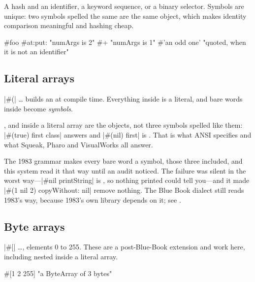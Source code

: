 A hash and an identifier, a keyword sequence, or a binary selector. Symbols
are unique: two symbols spelled the same are the same object, which makes
identity comparison meaningful and hashing cheap.

\begin{st}
#foo
#at:put:            "numArgs is 2"
#+                  "numArgs is 1"
#'an odd one'       "quoted, when it is not an identifier"
\end{st}

\subsection{Literal arrays}

\ct|#(| \ldots \ct{)} builds an  at compile time. Everything inside
is a literal, and bare words inside become \emph{symbols}.


\begin{stnote}
,  and  inside a literal array are the objects,
not three symbols spelled like them: \ct|#(true) first class| answers
 and \ct|#(nil) first| is . That is what ANSI specifies and
what Squeak, Pharo and VisualWorks all answer.

The 1983 grammar makes every bare word a symbol, those three included, and
this system read it that way until an audit noticed. The failure was silent
in the worst way---\ct|#nil printString| is , so nothing printed
could tell you---and it made \ct|#(1 nil 2) copyWithout: nil| remove nothing.
The Blue Book dialect still reads 1983's way, because 1983's own library
depends on it; see .
\end{stnote}

\subsection{Byte arrays}

\ct|#[| \ldots \ct{]}, elements 0 to 255. These are a post-Blue-Book
extension and work here, including nested inside a literal array.

\begin{st}
#[1 2 255]          "a ByteArray of 3 bytes"
\end{st}

